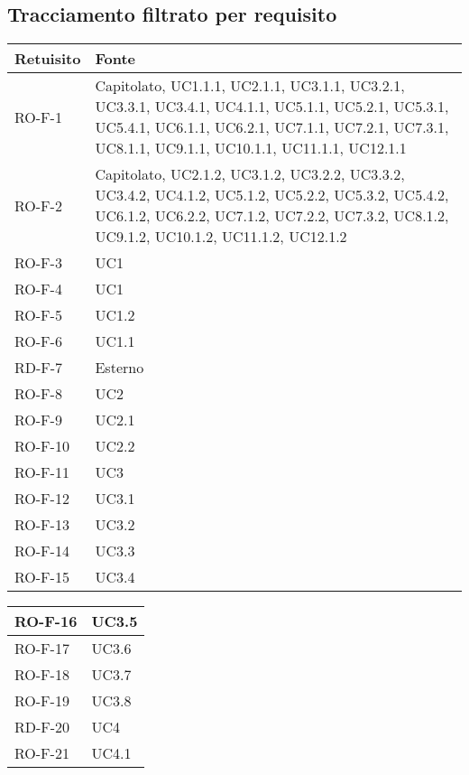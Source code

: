 \subsection{Tracciamento filtrato per requisito}
\begin{center}
\renewcommand{\arraystretch}{1.8} %
\begin{tabular}{ |m{8em}|m{13em}| }
    \hline
    \textbf{Retuisito} & \textbf{Fonte} \\
    \hline
    RO-F-1  &   Capitolato, UC1.1.1, UC2.1.1, UC3.1.1, UC3.2.1, UC3.3.1, UC3.4.1, UC4.1.1, UC5.1.1, UC5.2.1, UC5.3.1, UC5.4.1, UC6.1.1, UC6.2.1, UC7.1.1, UC7.2.1, UC7.3.1, UC8.1.1, UC9.1.1, UC10.1.1, UC11.1.1, UC12.1.1 \\
    \hline
    RO-F-2  &   Capitolato, UC2.1.2, UC3.1.2, UC3.2.2, UC3.3.2, UC3.4.2, UC4.1.2, UC5.1.2, UC5.2.2, UC5.3.2, UC5.4.2, UC6.1.2, UC6.2.2, UC7.1.2, UC7.2.2, UC7.3.2, UC8.1.2, UC9.1.2, UC10.1.2, UC11.1.2, UC12.1.2 \\
    \hline
    RO-F-3  &   UC1 \\
    \hline
    RO-F-4  &   UC1 \\
    \hline
    RO-F-5  &   UC1.2 \\
    \hline
    RO-F-6  &   UC1.1 \\
    \hline
    RD-F-7  &   Esterno \\
    \hline
    RO-F-8  &   UC2 \\
    \hline
    RO-F-9  &   UC2.1 \\
    \hline
    RO-F-10  &  UC2.2 \\
    \hline
    RO-F-11  &  UC3 \\
    \hline
    RO-F-12  &  UC3.1 \\
    \hline
    RO-F-13  &  UC3.2 \\
    \hline
    RO-F-14  &  UC3.3 \\
    \hline
    RO-F-15  &  UC3.4 \\
    \hline
    \end{tabular}
    \newpage
    \begin{tabular}{ |m{8em}|m{13em}| }
    \hline
    RO-F-16  &  UC3.5 \\
    \hline
    RO-F-17  &  UC3.6 \\
    \hline
    RO-F-18  &  UC3.7 \\
    \hline
    RO-F-19  &  UC3.8 \\
    \hline
    RD-F-20  &  UC4 \\
    \hline
    RO-F-21  &  UC4.1 \\

\end{tabular}
\end{center}
